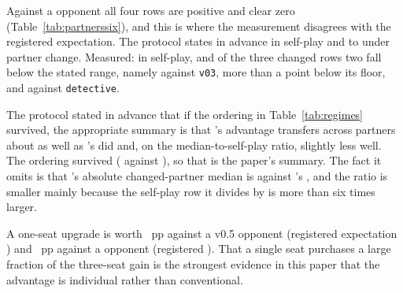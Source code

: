 Against a \vsix{} opponent all four rows are positive and clear zero
(Table~\ref{tab:partnerssix}), and this is where the measurement disagrees with the registered
expectation. The protocol states in advance \vsevenTrainOppSixSelf{} in self-play and
\vsevenTrainOppSixLo{} to \vsevenTrainOppSixHi{} under partner change. Measured:
\vsevenOppSixItself{} in self-play, and of the three changed rows two fall below the stated range,
namely \vsevenOppSixVthree{} against \texttt{v03}, more than a point below its floor, and
\vsevenOppSixDetective{} against \texttt{detective}.

\begin{table}[!ht]\centering
\caption{Partner-regime table against a \vsix{} opponent. Per-bank values are given in bank order,
7090001 then 7090002.}
\label{tab:partnerssix}
{\tabfont}
\end{table}

\begin{table}[!ht]\centering
\caption{Transfer across partners: \sestina{} over \vsix{} against \vsix{} over v0.5, on the same
eight settings and the same banks. The two training rows are quoted from the registered
protocol; the protocol records that its v0.6-over-v0.5
training row is computed on three of seven changed settings, so that row is not directly comparable
with the holdout row above it. Reported and not gated.}
\label{tab:regimes}
{\tabfont}
\end{table}

The protocol stated in advance that if the ordering in Table~\ref{tab:regimes} survived, the
appropriate summary is that \sestina{}'s advantage transfers across partners about as well as
\vsix{}'s did and, on the median-to-self-play ratio, slightly less well. The ordering survived
(\vsevenSoneRatio{} against \vsevenBaseRatio{}), so that is the paper's summary. The fact it omits is
that \sestina{}'s absolute changed-partner median is \vsevenSoneMedian{} against \vsix{}'s
\vsevenBaseMedian{}, and the ratio is smaller mainly because the self-play row it divides by is more
than six times larger.

A one-seat upgrade is worth \vsevenOneSeatFive{}~pp against a v0.5 opponent (registered expectation
\vsevenTrainOneSeatFive{}) and \vsevenOneSeatSix{}~pp against a \vsix{} opponent (registered
\vsevenTrainOneSeatSix{}). That a single seat purchases a large fraction of the three-seat gain is
the strongest evidence in this paper that the advantage is individual rather than conventional.

